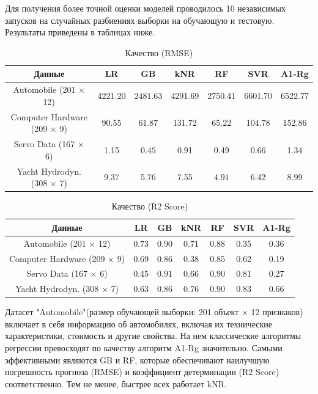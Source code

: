 \documentclass{article}
\begin{document}
Для получения более точной оценки моделей проводилось 10 независимых запусков на случайных разбиениях выборки на обучающую и тестовую. Результаты приведены в таблицах ниже.

\begin{table}[H]
\caption{Качество (RMSE)}
\begin{center}
\begin{tabular}{|c|c|c|c|c|c|c|}
    \hline
    Данные & LR & GB & kNR & RF & SVR & A1-Rg \\
    \hline
    Automobile (201 × 12) & 4221.20 & $\mathbf{2481.63}$ & 4291.69 & 2750.41 & 6601.70 & 6522.77  \\
    \hline
    Computer Hardware (209 × 9)  & 90.55 & $\mathbf{61.87}$ & 131.72 & 65.22 & 104.78 & 152.86  \\
    \hline
    Servo Data (167 × 6) & 1.15 & $\mathbf{0.45}$ & 0.91 & 0.49 & 0.66 & 1.34 \\
    \hline
    Yacht Hydrodyn. (308 × 7) & 9.37 & 5.76 & 7.55 & $\mathbf{4.91}$ & 6.42 & 8.99 \\
    \hline
\end{tabular}
\end{center}
\end{table}


\begin{table}[H]
\caption{Качество (R2 Score)}
\begin{center}
\begin{tabular}{|c|c|c|c|c|c|c|}
    \hline
    Данные & LR & GB & kNR & RF & SVR & A1-Rg \\
    \hline
    Automobile (201 × 12) & 0.73 & $\mathbf{0.90}$ & 0.71 & 0.88 & 0.35 & 0.36 \\
    \hline
    Computer Hardware (209 × 9) & 0.69 & $\mathbf{0.86}$ & 0.38 & 0.85 & 0.62 &  0.19 \\
    \hline
    Servo Data (167 × 6) & 0.45 & $\mathbf{0.91}$ & 0.66 & 0.90 & 0.81 & 0.27 \\
    \hline
    Yacht Hydrodyn. (308 × 7) & 0.63 & 0.86 & 0.76 & $\mathbf{0.90}$   & 0.83 & 0.66 \\
    \hline
\end{tabular}
\end{center}
\end{table}

Датасет "Automobile"(размер обучающей выборки: 201 объект × 12 признаков) включает в себя информацию об автомобилях, включая их технические характеристики, стоимость и другие свойства. На нем классические алгоритмы регрессии превосходят по качеству алгоритм A1-Rg значительно. Самыми эффективными являются GB и RF, которые обеспечивают наилучшую погрешность прогноза (RMSE) и коэффициент детерминации (R2 Score) соответственно. Тем не менее, быстрее всех работает kNR.
\end{document}
